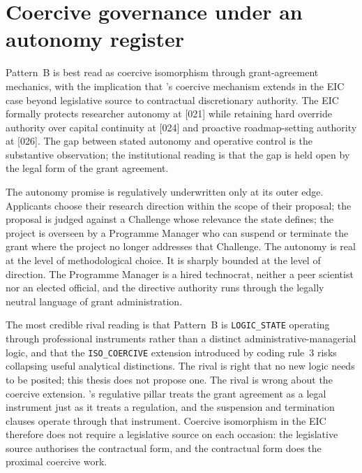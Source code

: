 \section{Coercive governance under an autonomy register}
\label{sec:disc-coercive}

Pattern~B is best read as coercive isomorphism through grant-agreement
mechanics, with the implication that
\textcite{dimaggio1983iron}'s coercive mechanism extends in the EIC
case beyond legislative source to contractual discretionary authority.
The EIC formally protects researcher autonomy at [021] while retaining
hard override authority over capital continuity at [024] and proactive
roadmap-setting authority at [026]. The gap between stated autonomy
and operative control is the substantive observation; the
institutional reading is that the gap is held open by the legal form
of the grant agreement.

The autonomy promise is regulatively underwritten only at its outer
edge. Applicants choose their research direction within the scope of
their proposal; the proposal is judged against a Challenge whose
relevance the state defines; the project is overseen by a Programme
Manager who can suspend or terminate the grant where the project no
longer addresses that Challenge. The autonomy is real at the level of
methodological choice. It is sharply bounded at the level of
direction. The Programme Manager is a hired technocrat, neither a
peer scientist nor an elected official, and the directive authority
runs through the legally neutral language of grant administration.

The most credible rival reading is that Pattern~B is
\texttt{LOGIC\_STATE} operating through professional instruments
rather than a distinct administrative-managerial logic, and that the
\texttt{ISO\_COERCIVE} extension introduced by coding rule~3 risks
collapsing useful analytical distinctions. The rival is right that no
new logic needs to be posited; this thesis does not propose one. The
rival is wrong about the coercive extension.
\textcite{scott2014institutions}'s regulative pillar treats the grant
agreement as a legal instrument just as it treats a regulation, and
the suspension and termination clauses operate through that
instrument. Coercive isomorphism in the EIC therefore does not require
a legislative source on each occasion: the legislative source
authorises the contractual form, and the contractual form does the
proximal coercive work.

